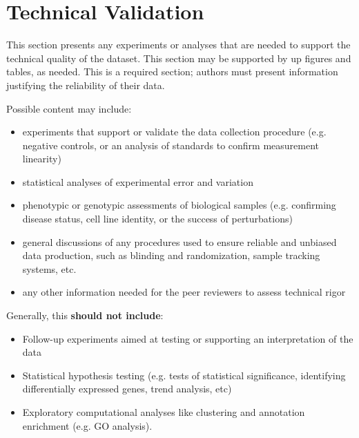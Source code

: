 \section{Technical Validation}

This section presents any experiments or analyses that are needed to support the technical quality of the dataset.  This section may be supported by up figures and tables, as needed. This is a required section; authors must present information justifying the reliability of their data. 

Possible content may include:
\begin{itemize}
\item experiments that support or validate the data collection procedure (e.g. negative controls, or an analysis of standards to confirm measurement linearity)
\item statistical analyses of experimental error and variation
\item phenotypic or genotypic assessments of biological samples (e.g. confirming disease status, cell line identity, or the success of perturbations)
\item general discussions of any procedures used to ensure reliable and unbiased data production, such as blinding and randomization, sample tracking systems, etc. 
\item any other information needed for the peer reviewers to assess technical rigor
\end{itemize}

Generally, this \textbf{should not include}:
\begin{itemize}
\item Follow-up experiments aimed at testing or supporting an interpretation of the data
\item Statistical hypothesis testing (e.g. tests of statistical significance, identifying differentially expressed genes, trend analysis, etc)
\item Exploratory computational analyses like clustering and annotation enrichment (e.g. GO analysis). 
\end{itemize}
